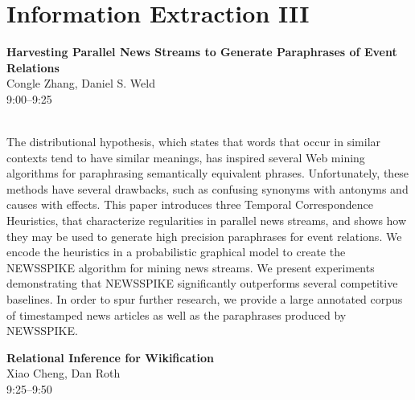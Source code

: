 \documentclass[twoside,makeidx]{book}
\begin{document}
\section{Information Extraction III}
\vspace{-1em}
\par\vspace{2em}\noindent%
\begin{minipage}{\linewidth}%
\begin{center}
\textbf{\normalsize Harvesting Parallel News Streams to Generate Paraphrases of Event Relations}\\
\normalsize  Congle Zhang,  Daniel S. Weld\\
{\small 9:00--9:25}\\
\end{center}
\end{minipage}\\[0.5em]
\nopagebreak%
\noindent%
{\small The distributional hypothesis, which states that words that occur in similar contexts tend to have similar meanings, has inspired several Web mining algorithms for paraphrasing semantically equivalent phrases. Unfortunately, these methods have several drawbacks, such as confusing synonyms with antonyms and causes with effects. This paper introduces three Temporal Correspondence Heuristics, that characterize regularities in parallel news streams, and shows how they may be used to generate high precision paraphrases for event relations. We encode the heuristics in a probabilistic graphical model to create the NEWSSPIKE algorithm for mining news streams. We present experiments demonstrating that NEWSSPIKE significantly outperforms several competitive baselines. In order to spur further research, we provide a large annotated corpus of timestamped news articles as well as the paraphrases produced by NEWSSPIKE.}
\par\vspace{2em}\noindent%
\begin{minipage}{\linewidth}%
\begin{center}
\textbf{\normalsize Relational Inference for Wikification}\\
\normalsize  Xiao Cheng,  Dan Roth\\
{\small 9:25--9:50}\\
\end{center}
\end{minipage}\\[0.5em]
\nopagebreak%
\noindent%
\end{document}
